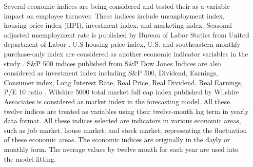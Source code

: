 \documentclass[12pt,letterpaper]{article}
\begin{document}
Several economic indices are being considered and tested their as a variable impact on employee turnover. These indices include unemployment index, housing price index (HPI), investment index, and marketing index. Seasonal adjusted unemployment rate is published by Bureau of Labor Statics from United department of Labor \citep{unemployment}. U.S housing price index, U.S. and southeastern monthly purchase-only index are considered as another economic indicator variables in the study \citep{HPI}. S\&P 500 indices published from S\&P Dow Jones Indices are also considered as investment index including S\&P 500, Dividend, Earnings, Consumer index, Long Interest Rate, Real Price, Real Dividend, Real Earnings, P/E 10 ratio \citep{sp500}. Wilshire 5000 total market full cap index published by Wilshire Associates is considered as market index in the forecasting model\citep{will5000}. All these twelve indices are treated as variables using their twelve-month lag term in yearly data format. All these indices selected are indicators in various economic areas, such as job market, house market, and stock market, representing the fluctuation of these economic areas. The economic indices are originally in the dayly or monthly form. The average values by  twelve month for each year are used into the model fitting.
\end{document}
